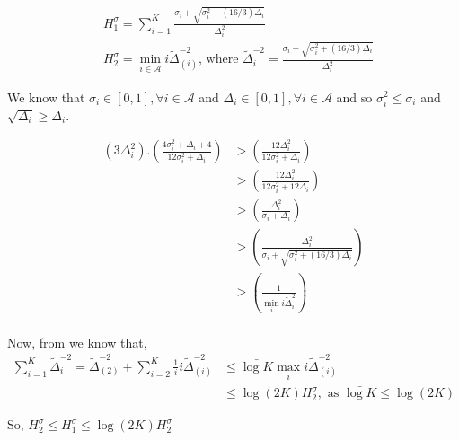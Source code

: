 \appendix
\begin{align*}
& H_{1}^{\sigma}=\sum_{i=1}^{K}\frac{\sigma_{i}+\sqrt{\sigma_{i}^{2}+(16/3)\Delta_{i}}}{\Delta_{i}^{2}}\\
& H_{2}^{\sigma}=\min_{i\in \mathcal{A}} i\tilde{\Delta}_{(i)}^{-2} \text{, where } \tilde{\Delta}_{i}^{-2}=\frac{\sigma_{i}+\sqrt{\sigma_{i}^{2}+(16/3)\Delta_{i}}}{\Delta_{i}^{2}}
\end{align*}

We know that $\sigma_{i}\in [0,1], \forall i\in \mathcal{A}$ and $\Delta_{i}\in [0,1], \forall i\in \mathcal{A}$ and so $\sigma_{i}^{2} \leq \sigma_{i}$ and $\sqrt{\Delta_{i}} \geq \Delta_{i}$.

\begin{align*}
(3\Delta_{i}^{2}).\left(\frac{4\sigma_{i}^{2}+\Delta_{i}+4}{12\sigma_{i}^{2}+\Delta_{i}}\right) & >  \left(\frac{12\Delta_{i}^{2}}{12\sigma_{i}^{2}+\Delta_{i}}\right)\\
& > \left(\frac{12\Delta_{i}^{2}}{12\sigma_{i}^{2}+12\Delta_{i}}\right)\\
& > \left(\frac{\Delta_{i}^{2}}{\sigma_{i}+\Delta_{i}}\right)\\
& > \left(\frac{\Delta_{i}^{2}}{\sigma_{i}+\sqrt{\sigma_{i}^{2} + (16/3)\Delta_{i}}}\right)\\
& > \left(\frac{1}{\min_{i}i\tilde{\Delta}_{i}^{2}}\right)\\
\end{align*}

Now, from \cite{audibert2010best} we know that,
\begin{align*}
\sum_{i=1}^{K}\tilde{\Delta}_{i}^{-2} = \tilde{\Delta}_{(2)}^{-2} + \sum_{i=2}^{K}\frac{1}{i}i\tilde{\Delta}_{(i)}^{-2} &\leq \bar{\log K}\max_{i}i\tilde{\Delta}_{(i)}^{-2}\\
& \leq \log(2K) H_{2}^{\sigma}, \text{ as $\bar{\log K} \leq \log(2K)$}
\end{align*}

So, $H_{2}^{\sigma} \leq H_{1}^{\sigma} \leq \log(2K) H_{2}^{\sigma}$

